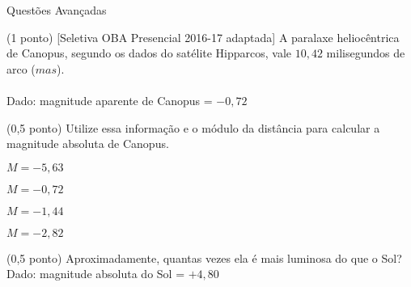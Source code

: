 \documentclass{../lista}
\begin{document}
\begin{secao}{Questões Avançadas}
		\begin{questao}{(1 ponto) [Seletiva OBA Presencial 2016-17 adaptada]}
			A paralaxe heliocêntrica de Canopus, segundo os dados do satélite Hipparcos, vale $10,42$ milisegundos de arco ($mas$). \\ \\
			Dado: magnitude aparente de Canopus = $-0,72$

			\begin{pergunta}{(0,5 ponto)}
				Utilize essa informação e o módulo da distância para calcular a magnitude absoluta de Canopus.


				\begin{alternativas}
					\alternativaMarcada $M = -5,63$
					\item $M = -0,72$
					\item $M = -1,44$
					\item $M = -2,82$
				\end{alternativas}
			\end{pergunta}

			\begin{pergunta}{(0,5 ponto)}
				Aproximadamente, quantas vezes ela é mais luminosa do que o Sol? \\
				Dado: magnitude absoluta do Sol = $+4,80$



\end{pergunta}
\end{questao}
\end{secao}
\end{document}
